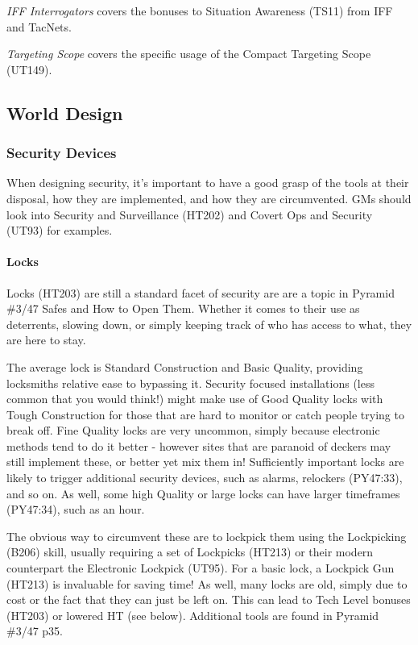 \begin{multicols}{2}
	\textit{IFF Interrogators} covers the bonuses to Situation Awareness (TS11) from IFF and TacNets.
	
	\textit{Targeting Scope} covers the specific usage of the Compact Targeting Scope (UT149).
	
	\subsection{World Design}
	
	\subsubsection{Security Devices}
	
	When designing security, it's important to have a good grasp of the tools at their disposal, how they are implemented, and how they are circumvented. GMs should look into Security and Surveillance (HT202) and Covert Ops and Security (UT93) for examples.
	
	\paragraph{Locks}
	
	Locks (HT203) are still a standard facet of security are are a topic in Pyramid \#3/47 Safes and How to Open Them. Whether it comes to their use as deterrents, slowing down, or simply keeping track of who has access to what, they are here to stay. 
	
	The average lock is Standard Construction and Basic Quality, providing locksmiths relative ease to bypassing it. Security focused installations (less common that you would think!) might make use of Good Quality locks with Tough Construction for those that are hard to monitor or catch people trying to break off. Fine Quality locks are very uncommon, simply because electronic methods tend to do it better - however sites that are paranoid of deckers may still implement these, or better yet mix them in! Sufficiently important locks are likely to trigger additional security devices, such as alarms, relockers (PY47:33), and so on. As well, some high Quality or large locks can have larger timeframes (PY47:34), such as an hour.
	
	The obvious way to circumvent these are to lockpick them using the Lockpicking (B206) skill, usually requiring a set of Lockpicks (HT213) or their modern counterpart the Electronic Lockpick (UT95). For a basic lock, a Lockpick Gun (HT213) is invaluable for saving time! As well, many locks are old, simply due to cost or the fact that they can just be left on. This can lead to Tech Level bonuses (HT203) or lowered HT (see below). Additional tools are found in Pyramid \#3/47 p35.
	

\end{multicols}
